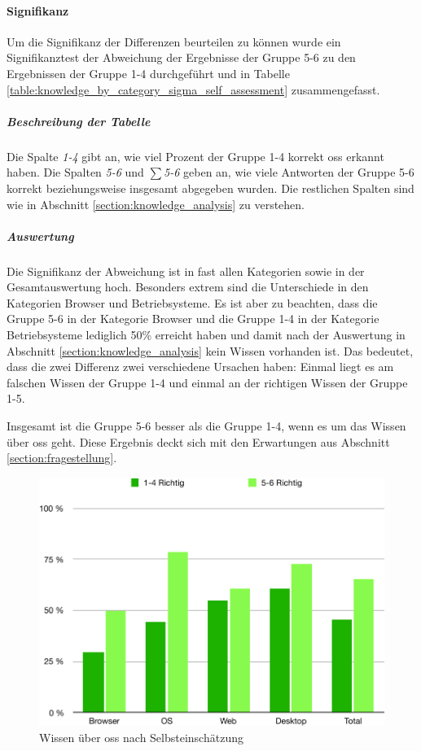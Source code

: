 \documentclass[a4paper]{article}
\begin{document}
                \paragraph{Signifikanz}
                    Um die Signifikanz der Differenzen beurteilen zu können wurde ein Signifikanztest der Abweichung der Ergebnisse der Gruppe 5-6 zu den Ergebnissen der Gruppe 1-4 durchgeführt und in Tabelle \ref{table:knowledge_by_category_sigma_self_assessment} zusammengefasst.
                    
                    \subparagraph{Beschreibung der Tabelle}
                        Die Spalte \emph{1-4} gibt an, wie viel Prozent der Gruppe 1-4 korrekt \gls{oss} erkannt haben. Die Spalten \emph{5-6} und \emph{$\sum$5-6} geben an, wie viele Antworten der Gruppe 5-6 korrekt beziehungsweise insgesamt abgegeben wurden. Die restlichen Spalten sind wie in Abschnitt \ref{section:knowledge_analysis} zu verstehen.

                    \subparagraph{Auswertung}
                        Die Signifikanz der Abweichung ist in fast allen Kategorien sowie in der Gesamtauswertung hoch. Besonders extrem sind die Unterschiede in den Kategorien Browser und Betriebsysteme. Es ist aber zu beachten, dass die Gruppe 5-6 in der Kategorie Browser und die Gruppe 1-4 in der Kategorie Betriebsysteme lediglich 50\% erreicht haben und damit nach der Auswertung in Abschnitt \ref{section:knowledge_analysis} kein Wissen vorhanden ist. Das bedeutet, dass die zwei Differenz zwei verschiedene Ursachen haben: Einmal liegt es am falschen Wissen der Gruppe 1-4 und einmal an der richtigen Wissen der Gruppe 1-5.
                        
                        Insgesamt ist die Gruppe 5-6 besser als die Gruppe 1-4, wenn es um das Wissen über \gls{oss} geht. Diese Ergebnis deckt sich mit den Erwartungen aus Abschnitt \ref{section:fragestellung}.
                    
                \begin{figure}
                    \includegraphics[width=\textwidth]{assets/results/openSourceJudging/openSourceJudgingDetailedOSSOnlyByKnowledge.pdf}
                    \caption{Wissen über \gls{oss} nach Selbsteinschätzung}
                    \label{figure:knowledge_by_category_self_assessment}
                \end{figure}
                
\end{document}
